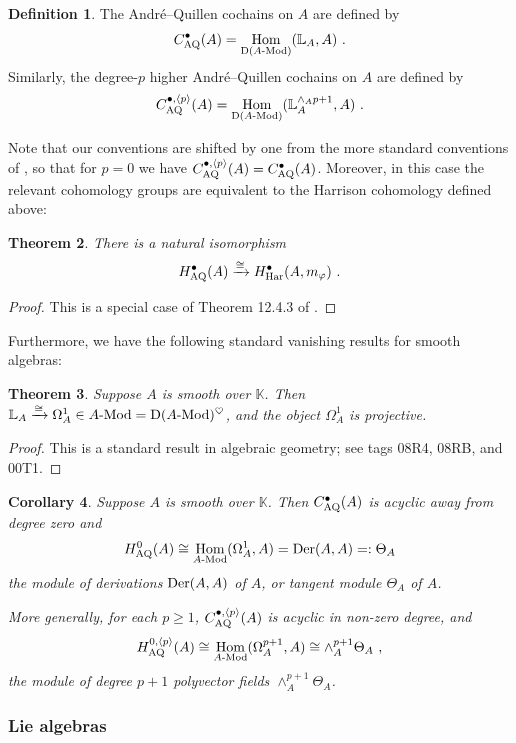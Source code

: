 \documentclass[11pt]{amsart}
\numberwithin{equation}{section}
\newtheorem{theo}{Theorem}[section]
\newtheorem{coro}[theo]{Corollary}
\theoremstyle{definition}
\newtheorem{defn}[theo]{Definition}
\newcommand{\bb}{\mathbb}
\newcommand{\mc}{\mathcal}
\newcommand{\AQ}{{\textup{AQ}}}
\newcommand{\bL}{{\mathbb{L}}}
\DeclareMathOperator{\Hom}{Hom}
\DeclareMathOperator{\Vect}{Vect}
\newcommand{\Mod}{{\textup{-Mod}}}
\newcommand{\K}{{\bb K}}
\newcommand{\End}{{\textup{End}}}
\newcommand{\Der}{{\textup{Der}}}
\newcommand{\Alg}{{\textup{Alg}}}
\newcommand{\Lie}{{\textup{Lie}}}
\newcommand{\Op}{{\textup{Op}}}
\newcommand{\0}{{\textbf{0}}}
\newcommand{\Dd}{{\textup{D}}}
\def \Op{\mathrm{Op}}
\begin{document}
\begin{defn}\label{AQDefn} The Andr\'e--Quillen cochains on $A$ are defined by
\[ C^\bullet_\AQ(A)= \Hom_{\Dd(A\Mod)}(\bL_A,A) \ .  \]
Similarly, the degree-$p$ higher Andr\'e--Quillen cochains on $A$ are defined by
\[ C^{\bullet,\langle p \rangle}_\AQ(A)= \Hom_{\Dd(A\Mod)}(\bL^{\wedge_A p+1}_A,A) \ .  \]
\end{defn}
Note that our conventions are shifted by one from the more standard conventions of \cite{Lod}, so that for $p=0$ we have $ C^{\bullet,\langle p \rangle}_\AQ(A)= C^\bullet_\AQ(A)$. Moreover, in this case the relevant cohomology groups are equivalent to the Harrison cohomology defined above:
\begin{theo} There is a natural isomorphism
\[ H^\bullet_\AQ(A)\xrightarrow{\cong} H^\bullet_{\textup{Har}}(A,m_\varphi) \ . \]
\end{theo}
\begin{proof}
	This is a special case of Theorem 12.4.3 of \cite{LV}.
\end{proof}


Furthermore, we have the following standard vanishing results for smooth algebras:

\begin{theo} \label{theo:smooth then kahler isproj}
Suppose $A$ is smooth over $\K$. Then $\bL_A\xrightarrow{\cong} \Omega_A^1\in A\Mod=\Dd(A\Mod)^\heartsuit$, and the object $\Omega_A^1$ is projective.
\end{theo}
\begin{proof} This is a standard result in algebraic geometry; see \cite{Stks} tags 08R4, 08RB, and 00T1.
\end{proof}

\begin{coro}\label{smthcoro} Suppose $A$ is smooth over $\K$. Then $C^\bullet_\AQ(A)$ is acyclic away from degree zero and
	\[ H^0_\AQ(A)\cong \Hom_{A\Mod}(\Omega^1_A,A) = \Der(A,A) = :\Theta_A \]
	the module of derivations $ \Der(A,A) $ of $A$, or tangent module $\Theta_A$ of $A$.
	
	More generally, for each $p\geq 1$, $C^{\bullet,\langle p \rangle }_\AQ(A)$ is acyclic in non-zero degree, and
	\[ 
	H^{0,\langle p \rangle}_\AQ(A)\cong \Hom_{A\Mod}(\Omega^{p+1}_A,A) \cong \wedge^{p+1}_A \Theta_A \ , 
	\]
	the module of degree $p+1$ polyvector fields $\wedge^{p+1}_A \Theta_A$.
\end{coro}



\subsubsection{Lie algebras} 
\end{document}
